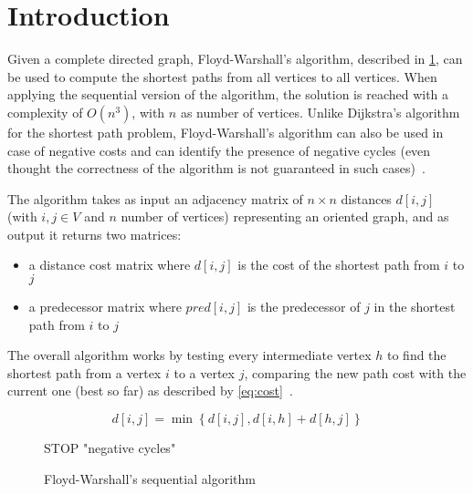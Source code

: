 \section{Introduction}\label{introduction}

Given a complete directed  graph, Floyd-Warshall's algorithm, described in \cref{alg:sequential}, can be used to compute the shortest paths from all vertices to all vertices.
When applying the sequential version of the algorithm, the solution is reached with a complexity of \(O(n^3)\), with \(n\) as number of vertices.
Unlike Dijkstra's algorithm for the shortest path problem, Floyd-Warshall's algorithm can also be used in case of negative costs and can identify the presence of negative cycles 
(even thought the correctness of the algorithm is not guaranteed in such cases)~\cite{fischetti}.

The algorithm takes as input an adjacency matrix of $n \times n$  distances $d[i,j]$ (with $i,j \in V$ and $n$ number of vertices) representing an oriented graph, and as output it returns two matrices:
\begin{itemize}
    \item a distance cost matrix where \(d[i,j]\) is the cost of the shortest path from \(i\) to \(j\)
    \item a predecessor matrix where \(pred[i,j]\) is the predecessor of \(j\) in the shortest path from \(i\) to \(j\)
  \end{itemize}

The overall algorithm works by testing every intermediate vertex \(h\) to find the shortest path from a vertex \(i\) to a vertex \(j\),
comparing the new path cost with the current one (best so far) as described by \cref{eq:cost}~\cite{fischetti}.

\begin{equation} \label{eq:cost}
    d[i,j] = \min\left\{ d[i,j], d[i,h]+d[h,j] \right\}
\end{equation}

\begin{figure}[htbp]
    \centering
    \begin{minipage}{.5\textwidth}
        \begin{algorithm}[H]
     { \label{alg:for-h}
         { \label{alg:for-i}
        }
         {
             {
                STOP  "negative cycles"
            }
        }
    }
\caption{Floyd-Warshall's sequential algorithm}
\label{alg:sequential}
\end{algorithm}
    \end{minipage}
\end{figure}


